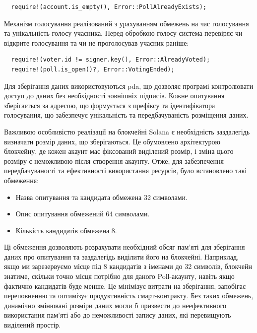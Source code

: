 \documentclass[14pt]{extreport}
\newcounter{req}[subsubsection]
\begin{document}
  {
  \begin{lstlisting}
  require!(account.is_empty(), Error::PollAlreadyExists);\end{lstlisting}}
  
  Механізм голосування реалізований з урахуванням обмежень на час голосування та унікальність голосу учасника. Перед обробкою голосу система перевіряє чи відкрите голосування та чи не проголосував учасник раніше:
  
  {
  \begin{lstlisting}
  require!(voter.id != signer.key(), Error::AlreadyVoted);
  require!(poll.is_open()?, Error::VotingEnded);\end{lstlisting}}
  
  Для зберігання даних використовуються \gls{pda}, що дозволяє програмі контролювати доступ до даних без необхідності зовнішніх підписів. Кожне опитування зберігається за адресою, що формується з префіксу та ідентифікатора голосування, що забезпечує унікальність та передбачуваність розміщення даних.

  Важливою особливістю реалізації на блокчейні Solana є необхідність заздалегідь визначати розмір даних, що зберігаються. Це обумовлено архітектурою блокчейну, де кожен акаунт має фіксований виділений розмір, і зміна цього розміру є неможливою після створення акаунту. Отже, для забезпечення передбачуваності та ефективності використання ресурсів, було встановлено такі обмеження:

  \begin{itemize}
    \item Назва опитування та кандидата обмежена 32 символами.
    \item Опис опитування обмежений 64 символами. 
    \item Кількість кандидатів обмежена 8.
  \end{itemize}

  Ці обмеження дозволяють розрахувати необхідний обсяг пам'яті для зберігання даних про опитування та заздалегідь виділити його на блокчейні. Наприклад, якщо ми зарезервуємо місце під 8 кандидатів з іменами до 32 символів, блокчейн знатиме, скільки точно місця потрібно для даного Poll-акаунту, навіть якщо фактично кандидатів буде менше. Це мінімізує витрати на зберігання, запобігає переповненню та оптимізує продуктивність смарт-контракту. Без таких обмежень, динамічно змінювані розміри даних могли б призвести до неефективного використання пам'яті або до неможливості запису даних, які перевищують виділений простір.
\end{document}
